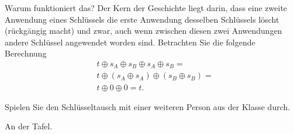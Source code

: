 \noindent
Warum funktioniert das? Der Kern der Geschichte liegt darin, dass eine zweite Anwendung eines Schlüssels die erste Anwendung desselben Schlüssels löscht (rückgängig macht) und
zwar, auch wenn zwischen diesen zwei Anwendungen andere Schlüssel angewendet worden sind. Betrachten Sie die folgende Berechnung
\begin{align*}
	 & t\oplus s_A \oplus s_B\oplus s_A\oplus s_B =    \\
	 & t\oplus (s_A\oplus s_A)\oplus (s_B\oplus s_B) = \\
	 & t\oplus 0\oplus 0 = t.
\end{align*}

\begin{myexercise}
	Spielen Sie den Schlüsseltausch mit einer weiteren Person aus der Klasse durch.
\end{myexercise}
\begin{myanswer}
	An der Tafel.
\end{myanswer}


\clearpage
